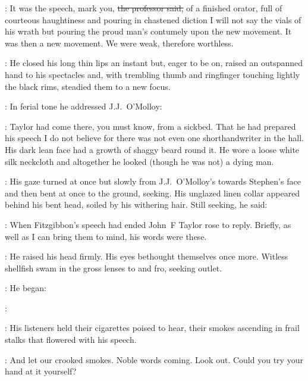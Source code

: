 \machugh:
It was the speech,
mark you,
\sout{the professor said,}
of a finished orator,
full of courteous haughtiness and pouring in chastened diction
I will not say the vials of his wrath
but pouring the proud man's contumely upon the new movement.
It was then a new movement.
We were weak,
therefore worthless.

:
He closed his long thin lips an instant
but, eager to be on,
raised an outspanned hand to his spectacles
and, with trembling thumb and ringfinger touching lightly the black rims,
steadied them to a new focus.



:
In ferial tone
he addressed J.J.~O'Molloy:

\machugh:
Taylor had come there,
you must know,
from a sickbed.
That he had prepared his speech I do not believe
for there was not even one shorthandwriter in the hall.
His dark lean face had a growth of shaggy beard round it.
He wore a loose white silk neckcloth
and altogether he looked (though he was not)
a dying man.

:
His gaze turned at once but slowly from J.J.~O'Molloy's
towards Stephen's face
and then bent at once to the ground,
seeking.
His unglazed linen collar appeared behind his bent head,
soiled by his withering hair.
Still seeking,
he said:

\machugh:
When Fitzgibbon's speech had ended
John~F Taylor rose to reply.
Briefly, as well as I can bring them to mind,
his words were these.

:
He raised his head firmly.
His eyes bethought themselves once more.
Witless shellfish swam in the gross lenses to and fro,
seeking outlet.

:
He began:

\machugh:
\stage{[Taylor]}

:
His listeners held their cigarettes poised to hear,
their smokes ascending in frail stalks that flowered with his speech.

\StephenInt:
And let our crooked smokes.
Noble words coming.
Look out.
Could you try your hand at it yourself?

